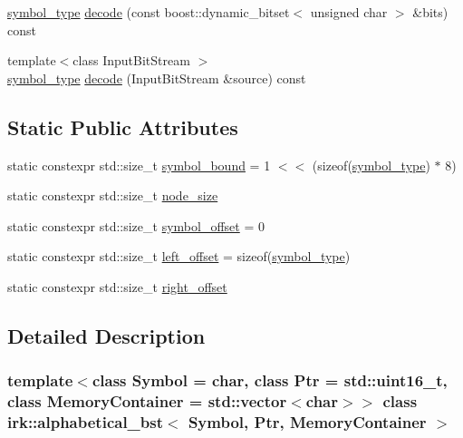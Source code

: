 \begin{DoxyCompactItemize}
\item 
\mbox{\hyperlink{classirk_1_1alphabetical__bst_a296ccb8fa9fa9dce3b3c3beab0a5ca28}{symbol\+\_\+type}} \mbox{\hyperlink{classirk_1_1alphabetical__bst_ab692b132ff3a1e9f27f95af247437e1d}{decode}} (const boost\+::dynamic\+\_\+bitset$<$ unsigned char $>$ \&bits) const
\item 
{\footnotesize template$<$class Input\+Bit\+Stream $>$ }\\\mbox{\hyperlink{classirk_1_1alphabetical__bst_a296ccb8fa9fa9dce3b3c3beab0a5ca28}{symbol\+\_\+type}} \mbox{\hyperlink{classirk_1_1alphabetical__bst_ad16d9e58c78eafe81f08c20171973cd7}{decode}} (Input\+Bit\+Stream \&source) const
\end{DoxyCompactItemize}
\subsection*{Static Public Attributes}
\begin{DoxyCompactItemize}
\item 
static constexpr std\+::size\+\_\+t \mbox{\hyperlink{classirk_1_1alphabetical__bst_aab79d45f120c441ecfe435a15f060553}{symbol\+\_\+bound}} = 1 $<$$<$ (sizeof(\mbox{\hyperlink{classirk_1_1alphabetical__bst_a296ccb8fa9fa9dce3b3c3beab0a5ca28}{symbol\+\_\+type}}) $\ast$ 8)
\item 
static constexpr std\+::size\+\_\+t \mbox{\hyperlink{classirk_1_1alphabetical__bst_a6f7d3f7002730eb7840e449d4d371235}{node\+\_\+size}}
\item 
static constexpr std\+::size\+\_\+t \mbox{\hyperlink{classirk_1_1alphabetical__bst_aeed9426027198ce7abe963119de8191d}{symbol\+\_\+offset}} = 0
\item 
static constexpr std\+::size\+\_\+t \mbox{\hyperlink{classirk_1_1alphabetical__bst_a0cc871d4fcdf8a37436594bc32eec076}{left\+\_\+offset}} = sizeof(\mbox{\hyperlink{classirk_1_1alphabetical__bst_a296ccb8fa9fa9dce3b3c3beab0a5ca28}{symbol\+\_\+type}})
\item 
static constexpr std\+::size\+\_\+t \mbox{\hyperlink{classirk_1_1alphabetical__bst_ac354051aeafc78d341cc467d65c8c45a}{right\+\_\+offset}}
\end{DoxyCompactItemize}


\subsection{Detailed Description}
\subsubsection*{template$<$class Symbol = char, class Ptr = std\+::uint16\+\_\+t, class Memory\+Container = std\+::vector$<$char$>$$>$\newline
class irk\+::alphabetical\+\_\+bst$<$ Symbol, Ptr, Memory\+Container $>$}

